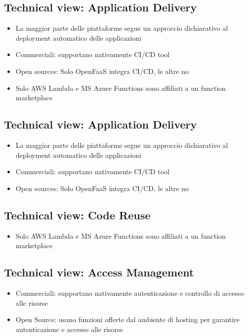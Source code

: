 \documentclass[a4paper, 12pt]{report}
\begin{document}
            \subsection{Technical view: Application Delivery}
            \begin{itemize}
              \item La maggior parte delle piattaforme segue un approccio dichiarativo al deployment automatico delle applicazioni
              \item Commerciali: supportano nativamente CI/CD tool
              \item Open sources: Solo OpenFaaS integra CI/CD, le altre no
            \end{itemize}
            \begin{itemize}
              \item Solo AWS Lambda e MS Azure Functions sono affiliati a un function marketplace
            \end{itemize}
            \subsection{Technical view: Application Delivery}
            \begin{itemize}
              \item La maggior parte delle piattaforme segue un approccio dichiarativo al deployment automatico delle applicazioni
              \item Commerciali: supportano nativamente CI/CD tool
              \item Open sources: Solo OpenFaaS integra CI/CD, le altre no
            \end{itemize}
            \subsection{Technical view: Code Reuse}
            \begin{itemize}
              \item Solo AWS Lambda e MS Azure Functions sono affiliati a un function marketplace
            \end{itemize}
            \subsection{Technical view: Access Management}
            \begin{itemize}
              \item Commerciali: supportano nativamente autenticazione e controllo di accesso alle risorse 
              \item Open Source: usano funzioni offerte dal ambiente di hosting per garantire autenticazione e accesso alle risorse
            \end{itemize}
            \clearpage
\end{document}

